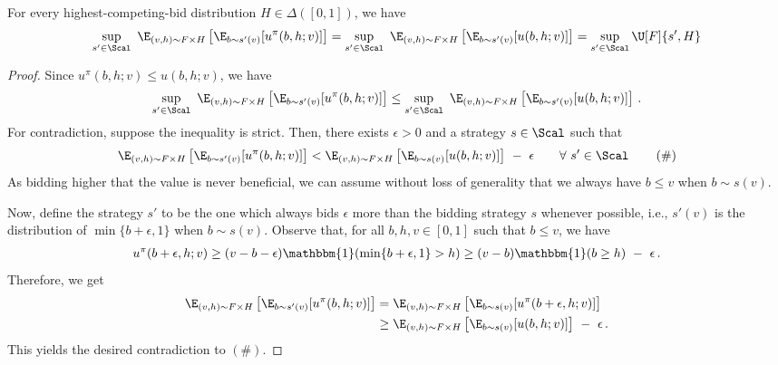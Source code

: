 \begin{lemma}\label{lemma:tie-breaking-bechmark}
    For every highest-competing-bid distribution $H \in \Delta([0,1])$, we have
    \begin{align*}
        \sup_{s' \in \Scal}\ \E_{(v,h) \sim F \times H}\left[ \E_{b \sim s'(v)}[u^\pi(b,h;v)] \right] = \sup_{s' \in \Scal}\ \E_{(v,h) \sim F \times H}\left[ \E_{b \sim s'(v)}[u(b,h;v)] \right] = \sup_{s' \in \Scal} \U[F]{s', H}
    \end{align*}
\end{lemma}
\begin{proof}
    Since $u^\pi(b,h;v) \leq u(b,h;v)$, we have
    \begin{align*}
        \sup_{s' \in \Scal}\ \E_{(v,h) \sim F \times H}\left[ \E_{b \sim s'(v)}[u^\pi(b,h;v)] \right] \leq \sup_{s' \in \Scal}\ \E_{(v,h) \sim F \times H}\left[ \E_{b \sim s'(v)}[u(b,h;v)] \right]\,.
    \end{align*}
    For contradiction, suppose the inequality is strict. Then, there exists $\epsilon > 0$ and a strategy $s \in \Scal$ such that
    \begin{align*}
        \E_{(v,h) \sim F \times H}\left[ \E_{b \sim s'(v)}[u^\pi(b,h;v)] \right] < \E_{(v,h) \sim F \times H}\left[ \E_{b \sim s(v)}[u(b,h;v)] \right]\ -\ \epsilon \qquad \forall\ s' \in \Scal\, \tag{\#}
    \end{align*}
    As bidding higher that the value is never beneficial, we can assume without loss of generality that we always have $b \leq v$ when $b \sim s(v)$. 
    
     Now, define the strategy $s'$ to be the one which always bids $\epsilon$ more than the bidding strategy $s$ whenever possible, i.e., $s'(v)$ is the distribution of $\min\{b+\epsilon, 1\}$ when $b \sim s(v)$.  Observe that, for all $b,h,v \in [0,1]$ such that $b \leq v$, we have 
    \begin{align*}
        u^\pi(b + \epsilon,h;v) \geq (v - b - \epsilon) \mathbbm{1}(\min\{b + \epsilon, 1\} > h) \geq (v - b) \mathbbm{1}(b \geq h)\ -\ \epsilon\,.
    \end{align*}
    Therefore, we get
    \begin{align*}
        \E_{(v,h) \sim F \times H}\left[ \E_{b \sim s'(v)}[u^\pi(b,h;v)] \right] &= \E_{(v,h) \sim F \times H}\left[ \E_{b \sim s(v)}[u^\pi(b+\epsilon,h;v)] \right]\\
        &\geq \E_{(v,h) \sim F \times H}\left[ \E_{b \sim s(v)}[u(b,h;v)] \right]\ -\ \epsilon\,.
    \end{align*}
    This yields the desired contradiction to $(\#)$.
\end{proof}

